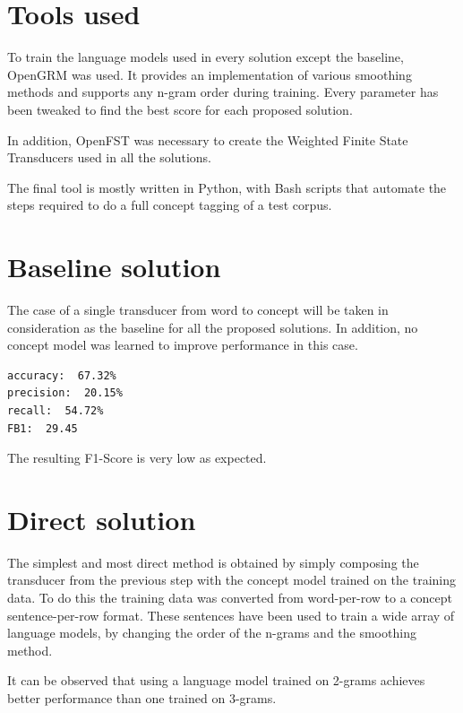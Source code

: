 \documentclass[11pt,a4paper]{article}
\begin{document}
\section{Tools used}

To train the language models used in every solution except the baseline, OpenGRM \cite{opengrm} was used. It provides an implementation of various smoothing methods and supports any n-gram order during training.
Every parameter has been tweaked to find the best score for each proposed solution.

In addition, OpenFST \cite{openfst} was necessary to create the Weighted Finite State Transducers used in all the solutions.

The final tool is mostly written in Python, with Bash scripts that automate the steps required to do a full concept tagging of a test corpus.

\section{Baseline solution}
The case of a single transducer from word to concept will be taken in consideration as the baseline for all the proposed solutions.
In addition, no concept model was learned to improve performance in this case.

\begin{verbatim}
accuracy:  67.32%
precision:  20.15%
recall:  54.72%
FB1:  29.45
\end{verbatim}

The resulting F1-Score is very low as expected.

\section{Direct solution}

The simplest and most direct method is obtained by simply composing the transducer from the previous step with the concept model trained on the training data.
To do this the training data was converted from word-per-row to a concept sentence-per-row format. These sentences have been used to train a wide array of language models, by changing the order of the n-grams and the smoothing method.

It can be observed that using a language model trained on 2-grams achieves better performance than one trained on 3-grams.
\end{document}
